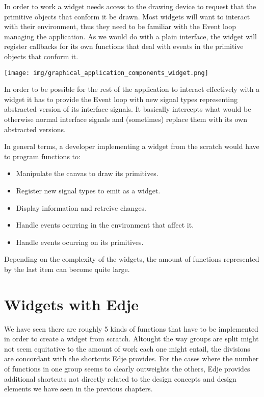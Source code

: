 \documentclass[12pt,a4paper,english]{book}
\begin{document}
In order to work a widget needs access to the drawing device to request that
the primitive objects that conform it be drawn. Most widgets will want to
interact with their environment, thus they need to be familiar with the Event
loop managing the application. As we would do with a plain interface, the
widget will register callbacks for its own functions that deal with events in
the primitive objects that conform it.

{\hfill\texttt{[image: img/graphical\_application\_components\_widget.png]}\hfill}

In order to be possible for the rest of the application to interact effectively
with a widget it has to provide the Event loop with new signal types
representing abstracted version of its interface signals. It basically
intercepts what would be otherwise normal interface signals and (sometimes)
replace them with its own abstracted versions.

In general terms, a developer implementing a widget from the scratch would have
to program functions to:
\begin{itemize}
\item {} 
Manipulate the canvas to draw its primitives.

\item {} 
Register new signal types to emit as a widget.

\item {} 
Display information and retreive changes.

\item {} 
Handle events ocurring in the environment that affect it.

\item {} 
Handle events ocurring on its primitives.

\end{itemize}

Depending on the complexity of the widgets, the amount of functions represented
by the last item can become quite large.



\hypertarget{widgets-with-edje}{}
\section{Widgets with Edje}
\label{widgets-with-edje}

We have seen there are roughly 5 kinds of functions that have to be implemented
in order to create a widget from scratch. Altought the way groups are split
might not seem equitative to the amount of work each one might entail, the
divisions are concordant with the shortcuts Edje provides. For the cases where
the number of functions in one group seems to clearly outweights the others,
Edje provides additional shortcuts not directly related to the design concepts
and design elements we have seen in the previous chapters.
\end{document}
